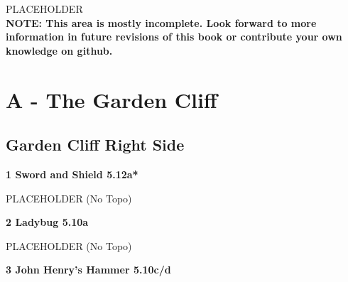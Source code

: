 







\raggedcolumns
\begin{multicols}{2}

\end{multicols}
\begin{multicols}{2}
PLACEHOLDER\\

\textbf{NOTE: This area is mostly incomplete. Look forward to more information in future revisions of this book or contribute your own knowledge on github.}\\


\newpage
	
		\section{A - The Garden Cliff}\label{sa:The Garden Cliff}
	
	
	
		
		\needspace{1.5cm}
		\subsection*{Garden Cliff Right Side}\label{bf:Garden Cliff Right Side}
			
		
			
			\needspace{1.5cm}
\label{rt:Sword and Shield}
\colorbox{Goldenrod!50}{
\parbox{0.95\linewidth}{
\textbf{
1 Sword and Shield 5.12a*  
}}}

			\begin{adjustwidth}{0.5cm}{}			
			PLACEHOLDER (No Topo)
			\end{adjustwidth}
			
			
			
			\needspace{1.5cm}
\label{rt:Ladybug}
\colorbox{RoyalBlue!20}{
\parbox{0.95\linewidth}{
\textbf{
2 Ladybug 5.10a  
}}}

			\begin{adjustwidth}{0.5cm}{}			
			PLACEHOLDER (No Topo)
			\end{adjustwidth}
			
			
			
			\needspace{1.5cm}
\label{rt:John Henry's Hammer}
\colorbox{RoyalBlue!20}{
\parbox{0.95\linewidth}{
\textbf{
3 John Henry's Hammer 5.10c/d  
}}}


\end{multicols}
